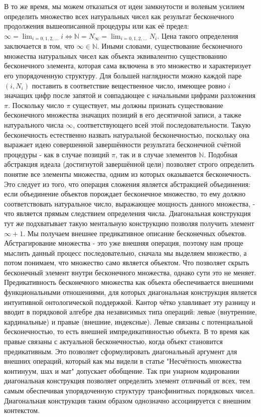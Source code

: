 \documentclass[12pt]{article}
\begin{document}
В то же время, мы можем отказаться от идеи замкнутости и волевым усилием определить множество всех натуральных чисел как результат бесконечного продолжения вышеописанной процедуры или как её предел: $\infty = \lim_{i = 0, 1, 2, \dots} i \Leftrightarrow \mathbb{N} = N_{\infty} = \lim_{i = 0, 1, 2, \dots} N_i$. Цена такого определения заключается в том, что $\infty \in \mathbb{N}$. Иными словами, существование бесконечного множества натуральных чисел как объекта эквивалентно существованию бесконечного элемента, которая сама включена в это множество и характеризует его упорядоченную структуру. Для большей наглядности можно каждой паре $(i, N_i)$ поставить в соответствие вещественное число, имеющее ровно $i$ значащих цифр после запятой и совпадающее с начальными цифрами разложения $\pi$. Поскольку число $\pi$ существует, мы должны признать существование бесконечного множества значащих позиций в его десятичной записи, а также натурального числа $\infty$, соответствующего всей этой последовательности. Такую бесконечность естественно назвать натуральной бесконечностью, поскольку она выражает идею совершенной завершённости результата бесконечной счётной процедуры - как в случае позиций $\pi$, так и в случае элементов $\mathbb{N}$. Подобная абстракция идеала (достигнутой завершённой цели) позволяет строго определить понятие все элементы множества, одним из которых оказывается бесконечность. Это следует из того, что операция сложения является абстракцией объединения: если объединение объектов порождает бесконечное множество, то ему должно соответствовать натуральное число, выражающее мощность данного множества, - что является прямым следствием определения числа. Диагональная конструкция тут же подхватывает такую ментальную конструкцию позволяя получить элемент $\infty + 1$. Мы получаем внешнее предикативное описание бесконечных объектов. Абстрагирование множества - это уже внешняя операция, поэтому нам проще мыслить данный процесс последовательно, сначала мы выделяем множество, а потом понимаем, что множество само является объектом. Что позволяет скрыть бесконечный элемент внутри бесконечного множества, однако сути это не меняет. Предикативность бесконечного множества как объекта обеспечивается внешними функциональными отношениями, для которых диагональная конструкция является интуитивной онтологической поддержкой. Кантор чётко улавливает эту разницу и вводит в порядковой алгебре два независимых типа операций: левые (внутренние, кардинальные) и правые (внешние, индексные). Левые связаны с потенциальной бесконечностью, то есть внешней импредикативностью объекта. В то время как правые связаны с актуальной бесконечностью, когда объект становится предикативным. Это позволяет сформулировать диагональный аргумент для внешних операций, который как мы видели в статье "Несчётность множества континуум, шах и мат" допускает обобщение. Так при унарном кодировании диагональная конструкция позволяет определить элемент отличный от всех, тем самым обеспечивая упорядоченную структуру трансфинитных порядковых чисел. Диагональная конструкция таким образом однозначно ассоциируется с внешним контекстом. 
\end{document}
